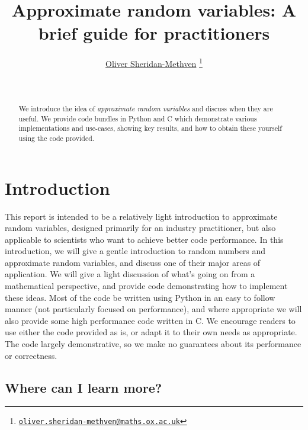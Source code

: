 \documentclass[11pt,a4paper,oneside,english]{extarticle}
\title{Approximate random variables: A brief guide for practitioners}
\author{\href{mailto:oliver.sheridan-methven@maths.ox.ac.uk}{Oliver Sheridan-Methven}%
\thanks{\href{mailto:oliver.sheridan-methven@maths.ox.ac.uk}%
{\texttt{oliver.sheridan-methven@maths.ox.ac.uk}}}
}
\date{\datedayname\ \nth{\number\day} \monthname\  \number\year}
\begin{document}
\linenumbers
\maketitle
{}

\begin{abstract}
We introduce the idea of \emph{approximate random variables} and discuss when they are useful. We provide code bundles in Python and C which demonstrate various implementations and use-cases, showing key results, and how to obtain these yourself using the code provided.  
\end{abstract}

\tableofcontents

\section{Introduction}

This report is intended to be a relatively light introduction to approximate random variables, designed primarily for an industry practitioner, but also applicable to scientists who want to achieve better code performance. In this introduction, we will give a gentle introduction to random numbers and approximate random variables, and discuss one of their major areas of application. We will give a light discussion of what's going on from a mathematical perspective, and provide code demonstrating how to implement these ideas. Most of the code be written using Python in an easy to follow manner (not particularly focused on performance), and where appropriate we will also provide some high performance code written in C. We encourage readers to use either the code provided as is, or adapt it to their own needs as appropriate. The code largely demonstrative, so we make no guarantees about its performance or correctness. 

\subsection{Where can I learn more?}
\label{sec:where_can_i_learn_more}
\end{document}
